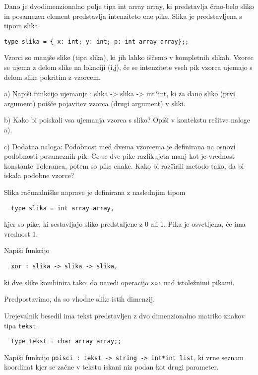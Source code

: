 \begin{ex}
Dano je dvodimenzionalno polje tipa int array array, ki predstavlja \v crno-belo sliko in posamezen element predstavlja intenziteto ene pike. Slika je predstavljena s tipom slika.
\begin{lstlisting}
type slika = { x: int; y: int; p: int array array};;
\end{lstlisting}
Vzorci so manj\v se slike (tipa slika), ki jih lahko i\v s\v cemo v kompletnih slikah. Vzorec se ujema z delom slike na lokaciji (i,j), \v ce se intenzitete vseh pik vzorca ujemajo s delom slike pokritim z vzorcem.

a) Napi\v si funkcijo ujemanje : slika -> slika -> int*int, ki za dano sliko (prvi argument) poi\v s\v ce pojavitev vzorca (drugi argument) v sliki.

b) Kako bi poiskali vsa ujemanja vzorca s sliko? Opi\v si v kontekstu re\v sitve naloge a).

c) Dodatna naloga: Podobnost med dvema vzorcema je definirana na osnovi podobnosti posameznih pik. \v Ce se dve pike razlikujeta manj kot je vrednost konstante Toleranca, potem so pike enake. Kako bi raz\v sirili metodo tako, da bi iskala podobne vzorce?
\end{ex}




\begin{ex}
  Slika ra\v cunalni\v ske naprave je definirana z naslednjim tipom

  \begin{lstlisting}
  type slika = int array array,
\end{lstlisting}

  kjer so pike, ki sestavljajo sliko predstaljene z 0 ali 1. Pika je
  osvetljena, \v ce ima vrednost 1.

  Napi\v si funkcijo

  \begin{lstlisting}
  xor : slika -> slika -> slika,
\end{lstlisting}

  ki dve slike kombinira tako, da naredi operacijo \lstinline{xor} nad
  istole\v znimi pikami.

  Predpostavimo, da so vhodne slike istih dimenzij.
\end{ex} 




\begin{ex}
  Urejevalnik besedil ima tekst predstavljen z dvo dimenzionalno
  matriko znakov tipa \lstinline{tekst}.

  \begin{lstlisting}
  type tekst = char array array;;
\end{lstlisting}
  Napi\v si funkcijo 
  \lstinline{poisci : tekst -> string -> int*int list}, 
  ki vrne seznam koordinat kjer se 
  za\v cne v tekstu iskani niz
  podan kot drugi parameter. 
\end{ex} 




